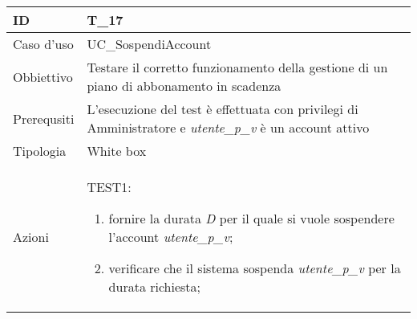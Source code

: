 \begin{table}[hb]
    \centering
    \begin{tabular}{ |p{2cm}|p{10cm}|  }
        \hline
        ID          & T\_17                                                                                                      \\\hline
        Caso d'uso  & UC\_SospendiAccount                                                                                        \\\hline
        Obbiettivo  & Testare il corretto funzionamento della gestione di un piano di abbonamento in scadenza                    \\\hline
        Prerequsiti & L'esecuzione del test è effettuata con privilegi di Amministratore e  \emph{utente\_p\_v} è un account attivo \\\hline
        Tipologia   & White box                                                                                                  \\\hline
        Azioni      &
        TEST1:
        \begin{enumerate}[nosep, topsep=0pt]
            \item fornire la durata \emph{D} per il quale si vuole sospendere l'account \emph{utente\_p\_v};
            \item verificare che il sistema sospenda \emph{utente\_p\_v} per la durata richiesta;
        \end{enumerate}

        \\\hline
    \end{tabular}
\end{table}

